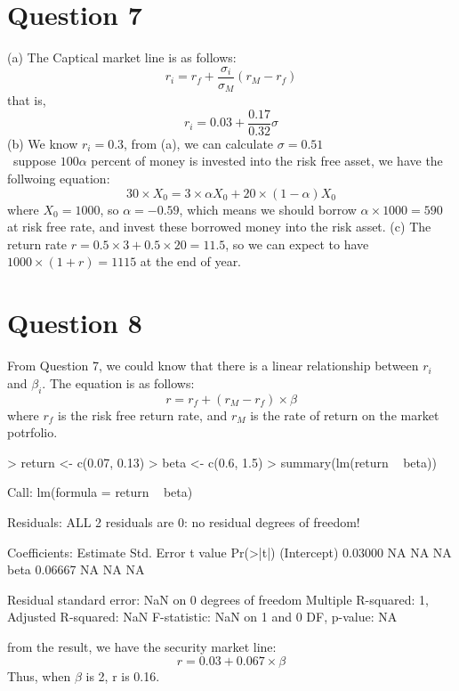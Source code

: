 \documentclass[a4paper,12pt]{article}
\begin{document}
\section*{Question 7}
\noindent (a) The Captical market line is as follows:\\
\begin{equation}
r_i = r_f + \frac{\sigma_i}{\sigma_M}(r_M - r_f)
\end{equation}
that is,
\begin{equation}
r_i = 0.03 + \frac{0.17}{0.32}\sigma
\end{equation}
\noindent (b) We know $r_i = 0.3$, from (a), we can calculate $\sigma = 0.51$\\\
\noindent suppose $100\alpha$ percent of money is invested into the risk free asset, we
have the follwoing equation:
\begin{equation}
30\times X_0 = 3\times\alpha X_0 + 20\times(1-\alpha)X_0
\end{equation}
where $X_0 = 1000$, so $\alpha = -0.59$, which means we should borrow $\alpha\times1000 =
590$ at risk free rate, and invest these borrowed money into the risk asset.
\noindent (c) The return rate $r = 0.5\times3 + 0.5\times20 = 11.5$, so we can expect to
have $1000\times(1 + r) = 1115$ at the end of year.
\section*{Question 8}
\noindent From Question 7, we could know that there is a linear relationship between $r_i$
and $\beta_i$. The equation is as follows:
\begin{equation}
r = r_f + (r_M -r_f)\times\beta
\end{equation}
where $r_f$ is the risk free return rate, and $r_M$ is the rate of return on the market potrfolio.
\begin{Schunk}
\begin{Sinput}
> return <- c(0.07, 0.13)
> beta <- c(0.6, 1.5)
> summary(lm(return ~ beta))
\end{Sinput}
\begin{Soutput}
Call:
lm(formula = return ~ beta)

Residuals:
ALL 2 residuals are 0: no residual degrees of freedom!

Coefficients:
            Estimate Std. Error t value Pr(>|t|)
(Intercept)  0.03000         NA      NA       NA
beta         0.06667         NA      NA       NA

Residual standard error: NaN on 0 degrees of freedom
Multiple R-squared:     1,	Adjusted R-squared:   NaN 
F-statistic:   NaN on 1 and 0 DF,  p-value: NA 
\end{Soutput}
\end{Schunk}
\noindent from the result, we have the security market line:\\
\begin{equation}
r = 0.03 + 0.067\times\beta
\end{equation}
Thus, when $\beta$ is 2, r is 0.16.
\end{document}
